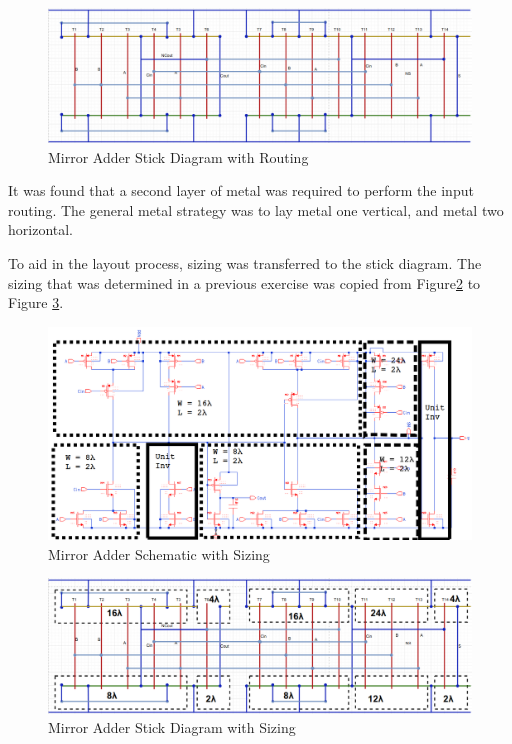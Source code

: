 \documentclass[11pt]{article}
\begin{document}
		\begin{figure}[H]
			\centering
			\includegraphics[width=1\linewidth]{"Pictures/MirrorAdder Stick Diagram Advanced"}
			\caption{Mirror Adder Stick Diagram with Routing}
			\label{fig:mirroradder-stick-diagram-advanced}
		\end{figure}
	
		It was found that a second layer of metal was required to perform the input routing. The general metal strategy was to lay metal one vertical, and metal two horizontal.
		
		
		To aid in the layout process, sizing was transferred to the stick diagram. The sizing that was determined in a previous exercise was copied from Figure\ref{fig:mirror-adder-schematic-sizing} to Figure \ref{fig:mirroradder-stick-diagram-sizing}.
		
		\begin{figure}[H]
			\centering
			\includegraphics[width=1\linewidth]{"Pictures/Mirror Adder Schematic Sizing"}
			\caption{Mirror Adder Schematic with Sizing}
			\label{fig:mirror-adder-schematic-sizing}
		\end{figure}
	
		\begin{figure}[H]
			\centering
			\includegraphics[width=1\linewidth]{"Pictures/MirrorAdder Stick Diagram Sizing"}
			\caption{Mirror Adder Stick Diagram with Sizing}
			\label{fig:mirroradder-stick-diagram-sizing}
		\end{figure}
		
\end{document}
